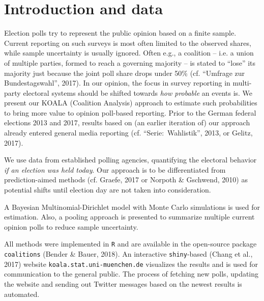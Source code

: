\documentclass[twoside]{report}
\begin{document}


\section{Introduction and data}
Election polls
try to represent the public opinion based on a finite sample. Current reporting on such surveys is most often limited to the observed shares, while sample uncertainty
is usually ignored. Often e.g., a coalition -- i.e. a union of multiple parties, formed to reach a governing majority -- is stated to ``lose'' its majority just because the joint poll share drops under 50\% (cf. ``Umfrage zur Bundestagswahl'', 2017).
In our opinion, the focus in survey reporting in multi-party electoral systems should be shifted towards
\textit{how probable} an events is. 
We present our KOALA (Coalition Analysis) approach to estimate such probabilities
to bring more value to opinion poll-based reporting.
Prior to the German federal elections 2013 and 2017, results based on (an earlier iteration of) our approach already entered general media reporting (cf. ``Serie:~Wahlistik'', 2013, or Gelitz, 2017).

We use data from
established polling agencies,
quantifying the electoral behavior \textit{if an election was held today}.
Our approach is to be differentiated from prediction-aimed methods (cf. Graefe, 2017 or Norpoth \& Gschwend, 2010) as potential shifts until election day are not taken into consideration.

A Bayesian Multinomial-Dirichlet model with Monte Carlo simulations is used for estimation. Also, a pooling approach is presented to summarize multiple current opinion polls to reduce sample uncertainty.

All methods were implemented in \texttt{R} and are available in the open-source
package \texttt{coalitions} (Bender \& Bauer, 2018). An
interactive \texttt{shiny}-based (Chang et al., 2017) website \texttt{koala.stat.uni-\allowbreak muenchen.\allowbreak de}
visualizes the results and is used for communication to the general public.
The process of fetching new polls, updating the website and sending out Twitter messages based on the newest results is automated.
\end{document}
